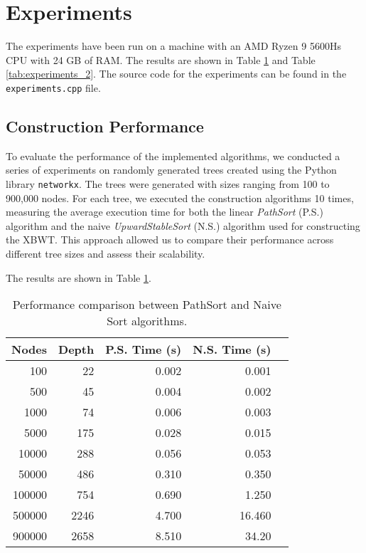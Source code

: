 \section{Experiments} 

The experiments have been run on a machine with an AMD Ryzen 9 5600Hs CPU with 24 GB of RAM. The results are shown in Table \cref{tab:experiments} and Table \cref{tab:experiments_2}. The source code for the experiments can be found in the \texttt{experiments.cpp} file.

\subsection{Construction Performance}
To evaluate the performance of the implemented algorithms, we conducted a series of experiments on randomly generated trees created using the Python library \texttt{networkx}. The trees were generated with sizes ranging from 100 to 900,000 nodes. For each tree, we executed the construction algorithms 10 times, measuring the average execution time for both the linear \emph{PathSort} (P.S.) algorithm and the naive \emph{UpwardStableSort} (N.S.) algorithm used for constructing the XBWT. This approach allowed us to compare their performance across different tree sizes and assess their scalability.


The results are shown in Table \cref{tab:experiments}.

\begin{table}[h]
    \centering
    \begin{tabular}{|r|r|r|r|r|}
        \hline
        \textbf{Nodes} & \textbf{Depth} & \textbf{P.S. Time (s)} & \textbf{N.S. Time (s)} \\
        \hline
        100 & 22 & 0.002 & 0.001 \\
        500 & 45 & 0.004 & 0.002  \\
        1000 & 74 & 0.006 & 0.003  \\
        5000 & 175 & 0.028 & 0.015 \\
        10000 & 288 & 0.056 & 0.053 \\
        50000 & 486 & 0.310 & 0.350 \\
        100000 & 754 & 0.690 & 1.250\\
        500000 & 2246 & 4.700 & 16.460 \\
        900000 & 2658 & 8.510 & 34.20 \\
        \hline
    \end{tabular}
    \caption{Performance comparison between PathSort  and Naive Sort  algorithms.}
    \label{tab:experiments}
\end{table}

